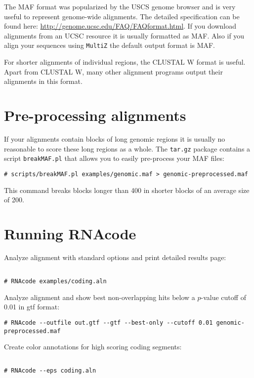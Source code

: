 \documentclass{article}
\begin{document}
The MAF format was popularized by the USCS genome browser and is very
useful to represent genome-wide alignments. The detailed specification
can be found here: \url{http://genome.ucsc.edu/FAQ/FAQformat.html}. If
you download alignments from an UCSC resource it is usually formatted
as MAF. Also if you align your sequences using \texttt{MultiZ} the
default output format is MAF.

For shorter alignments of individual regions, the CLUSTAL W format is
useful. Apart from CLUSTAL W, many other alignment programs output
their alignments in this format.

\section{Pre-processing alignments}

If your alignments contain blocks of long genomic regions it is
usually no reasonable to score these long regions as a whole. The
\texttt{tar.gz} package contains a script \texttt{breakMAF.pl} that
allows you to easily pre-process your MAF files:

\begin{verbatim}
# scripts/breakMAF.pl examples/genomic.maf > genomic-preprocessed.maf
\end{verbatim}

This command breaks blocks longer than 400 in shorter blocks of an
average size of 200.

\section{Running RNAcode}

Analyze alignment with standard options and print detailed results
page:

\begin{verbatim}

# RNAcode examples/coding.aln

\end{verbatim}

Analyze alignment and show best non-overlapping hits below a $p$-value
cutoff of 0.01 in gtf format:

\begin{verbatim}
# RNAcode --outfile out.gtf --gtf --best-only --cutoff 0.01 genomic-preprocessed.maf
\end{verbatim}

Create color annotations for high scoring coding segments:

\begin{verbatim}

# RNAcode --eps coding.aln

\end{verbatim}
\end{document}
